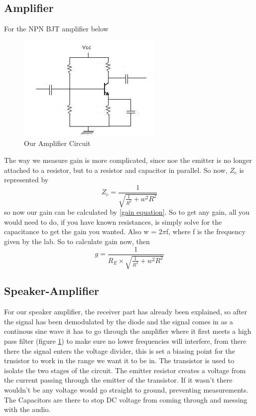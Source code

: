\documentclass[12 pt]{article}
\begin{document}
\subsection{Amplifier}
For the NPN BJT amplifier below
\begin{figure}[H]
\center
\includegraphics[scale=.6]{bjt_amplifier_lab2.png}
\caption{Our Amplifier Circuit}
\label{Amplifier}
\end{figure}
The way we measure gain is more complicated, since noe the emitter is no
longer attached to a resistor, but to a resistor and capacitor in
parallel. So now, $Z_c$ is represented by 
\begin{equation}
  \label{impedance for RC parallel}
  Z_c = \frac{1}{\sqrt{{\frac{1}{R^2} + w^2R^2}}}
\end{equation}
so now our gain can be calculated by \ref{gain equation}. So to get any
gain, all you would need to do, if you have known resistances, is simply
solve for the capacitance to get the gain you wanted. Also w = 2$\pi$f,
where f is the frequency given by the lab. So to calculate gain now,
then 
\begin{equation}
  \label{amplifier gain}
  g = \frac{1}{R_E\times\sqrt{{\frac{1}{R^2} + w^2R^2}}}
\end{equation}

\subsection{Speaker-Amplifier}
For our speaker amplifier, the receiver part has already been explained,
so after the signal has been demodulated by the diode and the signal
comes in as a continous sine wave it has to go through the amplifier
where it first meets a high pass filter (figure \ref{Amplifier}) to make
sure no lower frequencies will interfere, from there there the signal
enters the voltage divider, this is set a biasing point for the
trnsistor to work  in the range we want it to be in. The transistor is
used to isolate the two stages of the circuit. The emitter resistor
creates a voltage from the current passing through the emitter of the
transistor. If it wasn't there wouldn't be any voltage would go straight
to ground, preventing measurements. The Capacitors are there to stop DC
voltage from coming through and messing with the audio. 
\end{document}
